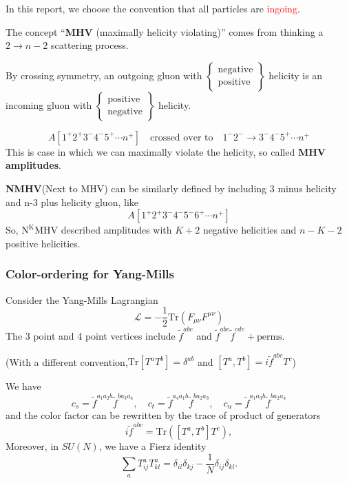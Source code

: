 \documentclass{beamer}
\begin{document}
\begin{frame}
    In this report, we choose the convention that all particles are \textcolor{red}{ingoing}.

    The concept “\textbf{MHV} (maximally helicity violating)” comes from thinking a ~$2 \rightarrow n-2$ scattering process.

    By crossing symmetry, an outgoing gluon with 
\(
\left\{
\begin{array}{l}
\text{negative} \\
\text{positive}
\end{array}
\right\}
\)
helicity is an incoming gluon with 
\(
\left\{
\begin{array}{l}
\text{positive} \\
\text{negative}
\end{array}
\right\}
\)
helicity.

\begin{equation*}
    A[1^+2^+3^-4^-5^+\cdots n^+]\quad \text{crossed over to} \quad 1^-2^-\rightarrow 3^-4^-5^+\cdots n^+
\end{equation*}
This is case in which we can maximally violate the helicity, so called \textbf{MHV amplitudes}.

\textbf{NMHV}(Next to MHV) can be similarly defined by including 3 minus helicity and n-3 plus helicity gluon, like 
\begin{equation*}
    A[1^+2^+3^-4^-5^-6^+\cdots n^+]
\end{equation*}
So, $\mathrm{N^KMHV}$ described amplitudes with $K+2$ negative helicities and $n-K-2$ positive helicities.
\end{frame}


\begin{frame}
    \frametitle{Color-ordering for Yang-Mills}
    Consider the Yang-Mills Lagrangian
    \begin{equation*}
        \mathcal{L}=-\frac{1}{2}\mathrm{Tr}(F_{\mu\nu}F^{\mu\nu})
    \end{equation*}
    The 3 point and 4 point vertices include $\tilde{f}^{abc}$ and $\tilde{f}^{abe}\tilde{f}^{cde}+\text{perms}$.

    (With a different convention,$\textrm{Tr}[T^aT^b]=\delta^{ab}$ and $[T^a,T^b]=i\tilde{f}^{abc}T^c$)

    We have 
    \begin{equation*}
        c_s=\tilde{f}^{a_1a_2b}\tilde{f}^{ba_3a_4},\quad c_t=\tilde{f}^{a_4a_1b}\tilde{f}^{ba_2a_3},\quad c_u=\tilde{f}^{a_1a_3b}\tilde{f}^{ba_2a_4}
    \end{equation*}
    and the color factor can be rewritten by the trace of product of generators
    \begin{equation*}
        i\tilde{f}^{abc}=\mathrm{Tr}([T^a,T^b]T^c),
    \end{equation*}
    Moreover, in $SU(N)$, we have a Fierz identity
    \begin{equation*}
        \sum_{a}T^a_{ij}T^a_{kl}=\delta_{il}\delta_{kj}-\frac{1}{N}\delta_{ij}\delta_{kl}.
    \end{equation*}
\end{frame}
    
\end{document}
